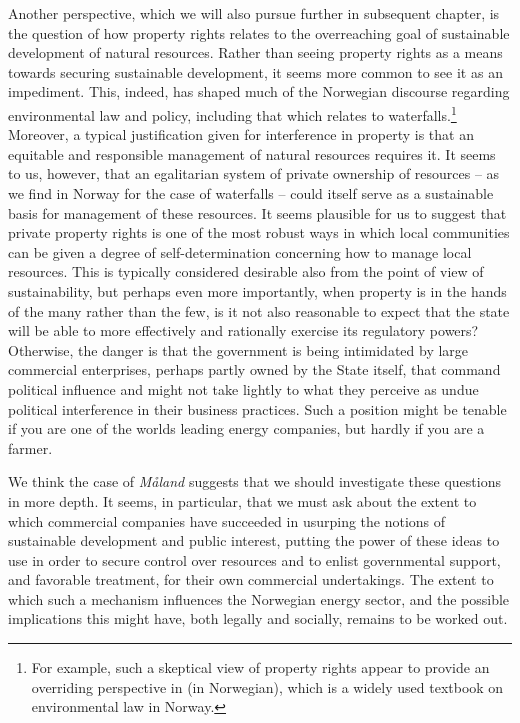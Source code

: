Another perspective, which we will also pursue further in subsequent chapter, is the question of how property rights relates to the overreaching goal of sustainable development of natural resources. Rather than seeing property rights as a means towards securing sustainable development, it seems more common to see it as an impediment. This, indeed, has shaped much of the Norwegian discourse regarding environmental law and policy, including that which relates to waterfalls.\footnote{For example, such a skeptical view of property rights appear to provide an overriding perspective in \cite{backer1} (in Norwegian), which is a widely used textbook on environmental law in Norway.} Moreover, a typical justification given for interference in property is that an equitable and responsible management of natural resources requires it. It seems to us, however, that an egalitarian system of private ownership of resources -- as we find in Norway for the case of waterfalls -- could itself serve as a sustainable basis for management of these resources. It seems plausible for us to suggest that private property rights is one of the most robust ways in which local communities can be given a degree of self-determination concerning how to manage local resources. This is typically considered desirable also from the point of view of sustainability, but perhaps even more importantly, when property is in the hands of the many rather than the few, is it not also reasonable to expect that the state will be able to more effectively and rationally exercise its regulatory powers? Otherwise, the danger is that the government is being intimidated by large commercial enterprises, perhaps partly owned by the State itself, that command political influence and might not take lightly to what they perceive as undue political interference in their business practices. Such a position might be tenable if you are one of the worlds leading energy companies, but hardly if you are a farmer. 

We think the case of \emph{Måland} suggests that we should investigate these questions in more depth. It seems, in particular, that we must ask about the extent to which commercial companies have succeeded in usurping the notions of sustainable development and public interest, putting the power of these ideas to use in order to secure control over resources and to enlist governmental support, and favorable treatment, for their own commercial undertakings. The extent to which such a mechanism influences the Norwegian energy sector, and the possible implications this might have, both legally and socially, remains to be worked out.

